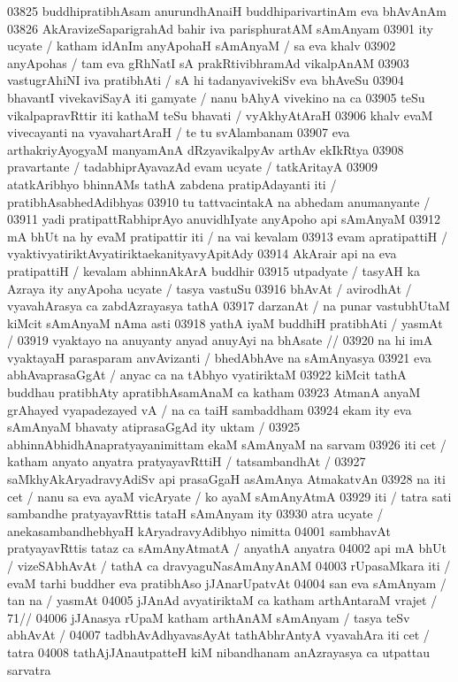 03825 buddhipratibhAsam anurundhAnaiH buddhiparivartinAm eva bhAvAnAm
03826 AkAravizeSaparigrahAd bahir iva parisphuratAM sAmAnyam
03901 ity ucyate / katham idAnIm anyApohaH sAmAnyaM / sa eva khalv
03902 anyApohas / tam eva gRhNatI sA prakRtivibhramAd vikalpAnAM
03903 vastugrAhiNI iva pratibhAti / sA hi tadanyavivekiSv eva bhAveSu
03904 bhavantI vivekaviSayA iti gamyate / nanu bAhyA vivekino na ca  
03905 teSu vikalpapravRttir iti kathaM teSu bhavati / vyAkhyAtAraH 
03906 khalv evaM vivecayanti na vyavahartAraH / te tu svAlambanam  
03907 eva arthakriyAyogyaM manyamAnA dRzyavikalpyAv arthAv ekIkRtya  
03908 pravartante / tadabhiprAyavazAd evam ucyate / tatkAritayA 
03909 atatkAribhyo bhinnAMs tathA zabdena pratipAdayanti iti / pratibhAsabhedAdibhyas
03910 tu tattvacintakA na abhedam anumanyante / 
03911 yadi pratipattRabhiprAyo anuvidhIyate anyApoho api sAmAnyaM
03912 mA bhUt na hy evaM pratipattir iti / na vai kevalam
03913 evam apratipattiH / vyaktivyatiriktAvyatiriktaekanityavyApitAdy
03914 AkArair api na eva pratipattiH / kevalam abhinnAkArA buddhir 
03915 utpadyate / tasyAH ka Azraya ity anyApoha ucyate / tasya vastuSu 
03916 bhAvAt / avirodhAt / vyavahArasya ca zabdAzrayasya tathA
03917 darzanAt / na punar vastubhUtaM kiMcit sAmAnyaM nAma asti  
03918 yathA iyaM buddhiH pratibhAti / yasmAt / 
03919 	vyaktayo na anuyanty anyad anuyAyi na bhAsate //  
03920 na hi imA vyaktayaH parasparam anvAvizanti / bhedAbhAve na sAmAnyasya
03921 eva abhAvaprasaGgAt / anyac ca na tAbhyo vyatiriktaM
03922 kiMcit tathA buddhau pratibhAty apratibhAsamAnaM ca katham
03923 AtmanA anyaM grAhayed vyapadezayed vA / na ca taiH sambaddham
03924 ekam ity eva sAmAnyaM bhavaty atiprasaGgAd ity uktam /  
03925 abhinnAbhidhAnapratyayanimittam ekaM sAmAnyaM na sarvam
03926 iti cet / katham anyato anyatra pratyayavRttiH / tatsambandhAt / 
03927 saMkhyAkAryadravyAdiSv api prasaGgaH asAmAnya AtmakatvAn
03928 na iti cet / nanu sa eva ayaM vicAryate / ko ayaM sAmAnyAtmA 
03929 iti / tatra sati sambandhe pratyayavRttis tataH sAmAnyam ity  
03930 atra ucyate / anekasambandhebhyaH kAryadravyAdibhyo nimitta  
04001 sambhavAt pratyayavRttis tataz ca sAmAnyAtmatA / anyathA anyatra 
04002 api mA bhUt / vizeSAbhAvAt / tathA ca dravyaguNasAmAnyAnAM
04003 rUpasaMkara iti / evaM tarhi buddher eva pratibhAso jJAnarUpatvAt  
04004 san eva sAmAnyam / tan na / yasmAt 
04005 	jJAnAd avyatiriktaM ca katham arthAntaraM vrajet /  71//
04006 jJAnasya rUpaM katham arthAnAM sAmAnyam / tasya teSv abhAvAt / 
04007 tadbhAvAdhyavasAyAt tathAbhrAntyA vyavahAra iti cet / tatra 
04008 tathAjJAnautpatteH kiM nibandhanam anAzrayasya ca utpattau sarvatra  
